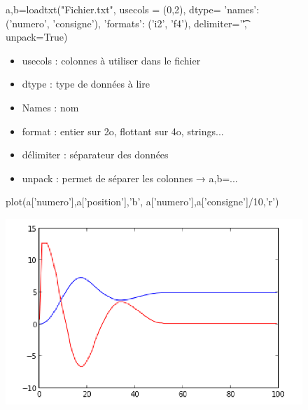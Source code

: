 \documentclass[10pt,fleqn]{article} %
\begin{document}
\begin{figure}[h]
\begin{minipage}[c]{.59\linewidth}

\begin{py}
\begin{python}[h]
a,b=loadtxt("Fichier.txt",
		usecols = (0,2),
		dtype={
			'names': ('numero', 'consigne'),
			'formats': ('i2', 'f4')},
		delimiter='\t',
		unpack=True)
\end{python}
\end{py}

\end{minipage} \hfill
\begin{minipage}[c]{.39\linewidth}
\begin{itemize}
\item usecols : colonnes à utiliser dans le fichier
\item dtype : type de données à lire
\item Names : nom
\item format : entier sur 2o, flottant sur 4o, strings...
\item délimiter : séparateur des données
\item unpack : permet de séparer les colonnes → a,b=...
\end{itemize}
\end{minipage}
\end{figure}


\begin{figure}[h]
\begin{minipage}[c]{.49\linewidth}

\begin{py}
\begin{python}[h]
plot(a['numero'],a['position'],'b',
		a['numero'],a['consigne']/10,'r')
\end{python}
\end{py}

\end{minipage} \hfill
\begin{minipage}[c]{.49\linewidth}
\begin{center}
\includegraphics[width=.99\textwidth]{images/image10.png}
\end{center}
\end{minipage}
\end{figure}
\end{document}
